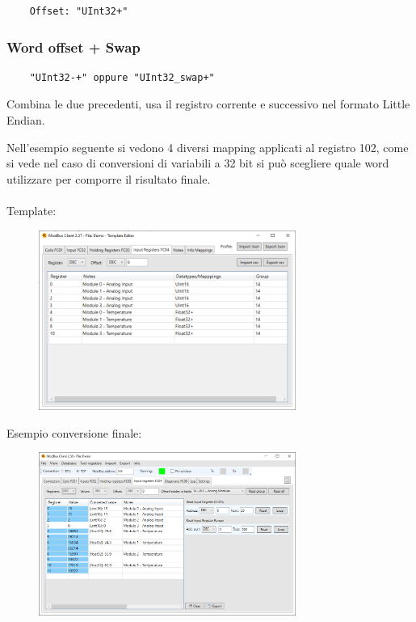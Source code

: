 \begin{verbatim}
    Offset: "UInt32+"
\end{verbatim}

\subsubsection{Word offset + Swap}

\begin{verbatim}
    "UInt32-+" oppure "UInt32_swap+"
\end{verbatim}

Combina le due precedenti, usa il registro corrente e successivo nel formato Little Endian.

\newpage

Nell'esempio seguente si vedono 4 diversi mapping applicati al registro 102, come si vede nel caso
di conversioni di variabili a 32 bit si può scegliere quale word utilizzare per comporre il risultato
finale.
\\\\
Template:

\begin{figure}[H]
\centering
\includegraphics[width=0.75\textwidth]{../Img/Modbus_Client_Template_00.PNG}
\caption{}
\end{figure}

Esempio conversione finale:

\begin{figure}[H]
\centering
\includegraphics[width=0.75\textwidth]{../Img/ModBus_Client_Template_ReadDemo00.PNG}
\caption{}
\end{figure}
